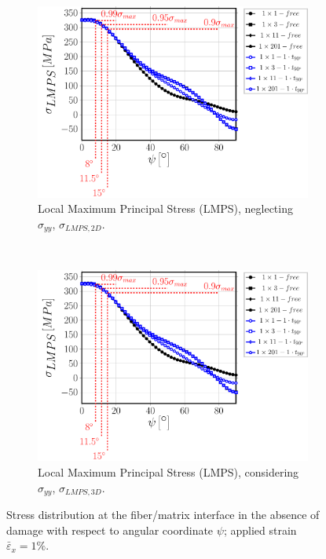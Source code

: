 \begin{figure}[!hp]
    \begin{subfigure}[b]{0.475\textwidth}
        \includegraphics[width=\textwidth]{paperE/vf60-nodamage-sigmaI2D.pdf}
        \caption{Local Maximum Principal Stress (LMPS), neglecting $\sigma_{yy}$, $\sigma_{LMPS,2D}$.}\label{paperE:fig:stress-g}
    \end{subfigure} ~
    \begin{subfigure}[b]{0.475\textwidth}
        \includegraphics[width=\textwidth]{paperE/vf60-nodamage-sigmaI3D.pdf}
        \caption{Local Maximum Principal Stress (LMPS), considering $\sigma_{yy}$, $\sigma_{LMPS,3D}$.}\label{paperE:fig:stress-h}
    \end{subfigure}

\caption{Stress distribution at the fiber/matrix interface in the absence of damage with respect to angular coordinate $\psi$; applied strain $\bar{\varepsilon}_{x}=1\%$.}\label{paperE:fig:stress}
\end{figure}

